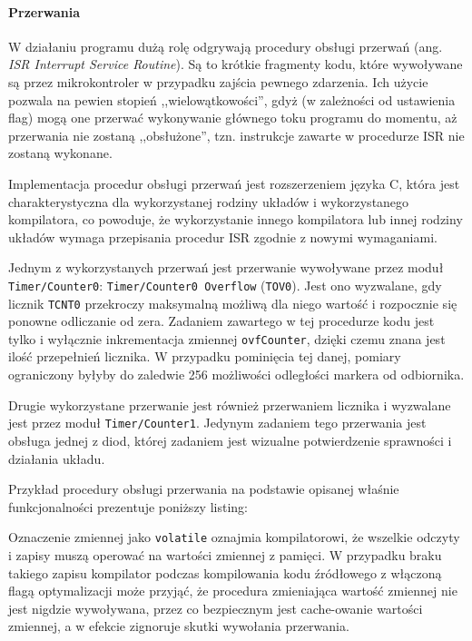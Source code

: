 \paragraph{Przerwania}
W działaniu programu dużą rolę odgrywają procedury obsługi przerwań (ang. \textsl{ISR \ppauza Interrupt Service Routine}). Są to krótkie fragmenty kodu, które wywoływane są przez mikrokontroler w przypadku zajścia pewnego zdarzenia. Ich użycie pozwala na pewien stopień ,,wielowątkowości'', gdyż (w zależności od ustawienia flag) mogą one przerwać wykonywanie głównego toku programu do momentu, aż przerwania nie zostaną ,,obsłużone'', tzn. instrukcje zawarte w procedurze ISR nie zostaną wykonane.

Implementacja procedur obsługi przerwań jest rozszerzeniem języka C, która jest charakterystyczna dla wykorzystanej rodziny układów i wykorzystanego kompilatora, co powoduje, że wykorzystanie innego kompilatora lub innej rodziny układów wymaga przepisania procedur ISR zgodnie z nowymi wymaganiami.

Jednym z wykorzystanych przerwań jest przerwanie wywoływane przez moduł \texttt{Timer/Counter0}: \texttt{Timer/Counter0 Overflow} (\texttt{TOV0}). Jest ono wyzwalane, gdy licznik \texttt{TCNT0} przekroczy maksymalną możliwą dla niego wartość i rozpocznie się ponowne odliczanie od zera. Zadaniem zawartego w tej procedurze kodu jest tylko i wyłącznie inkrementacja zmiennej \texttt{ovfCounter}, dzięki czemu znana jest ilość przepełnień licznika. W przypadku pominięcia tej danej, pomiary ograniczony byłyby do zaledwie 256 możliwości odległości markera od odbiornika.

Drugie wykorzystane przerwanie jest również przerwaniem licznika i wyzwalane jest przez moduł \texttt{Timer/Counter1}. Jedynym zadaniem tego przerwania jest obsługa jednej z diod, której zadaniem jest wizualne potwierdzenie sprawności i działania układu.

Przykład procedury obsługi przerwania na podstawie opisanej właśnie funkcjonalności prezentuje poniższy listing:



Oznaczenie zmiennej jako \texttt{volatile} oznajmia kompilatorowi, że wszelkie odczyty i zapisy muszą operować na wartości zmiennej z pamięci. W przypadku braku takiego zapisu kompilator podczas kompilowania kodu źródłowego z włączoną flagą optymalizacji może przyjąć, że procedura zmieniająca wartość zmiennej nie jest nigdzie wywoływana, przez co bezpiecznym jest cache-owanie wartości zmiennej, a w efekcie zignoruje skutki wywołania przerwania.

